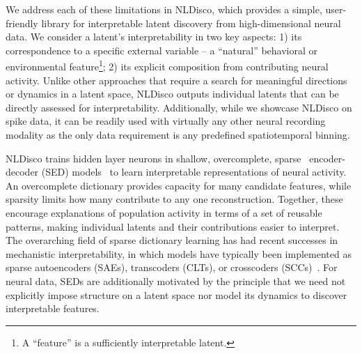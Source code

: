 We address each of these limitations in NLDisco, which provides a simple, user-friendly library for interpretable latent discovery from high-dimensional neural data. We consider a latent's interpretability in two key aspects: 1) its correspondence to a specific external variable -- a ``natural'' behavioral or environmental feature\footnote{\fontsize{8}{8}\selectfont  A ``feature'' is a sufficiently interpretable latent.}; 2) its explicit composition from contributing neural activity. Unlike other approaches that require a search for meaningful directions or dynamics in a latent space, NLDisco outputs individual latents that can be directly assessed for interpretability. Additionally, while we showcase NLDisco on spike data, it can be readily used with virtually any other neural recording modality as the only data requirement is any predefined spatiotemporal binning.

NLDisco trains hidden layer neurons in shallow, overcomplete, sparse~\citep{olshausen_1997_sparse_overcomplete} encoder-decoder (SED) models~\citep{vincent_2008_denoising_autoencoders} to learn interpretable representations of neural activity. An overcomplete dictionary provides capacity for many candidate features, while sparsity limits how many contribute to any one reconstruction. Together, these encourage explanations of population activity in terms of a set of reusable patterns, making individual latents and their contributions easier to interpret. The overarching field of sparse dictionary learning has had recent successes in mechanistic interpretability, in which models have typically been implemented as sparse autoencoders (SAEs), transcoders (CLTs), or crosscoders (SCCs)~\citep{lindsey_2024_crosscoders, cunningham_2023_saes, bricken_2023_towards_monosemanticity, templeton_2024_scaling_monosemanticity, dunefsky_2024_transcoders, ameisen_2025_circuit_tracing, lindsey_2025_biology_llm}. For neural data, SEDs are additionally motivated by the principle that we need not explicitly impose structure on a latent space nor model its dynamics to discover interpretable features.

